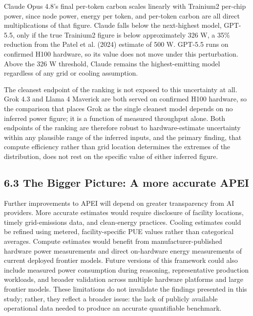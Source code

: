 \documentclass[11pt]{article}
\begin{document}
Claude Opus 4.8's final per-token carbon scales linearly with Trainium2 per-chip power, since node power, energy per token, and per-token carbon are all direct multiplications of that figure. Claude falls below the next-highest model, GPT-5.5, only if the true Trainium2 figure is below approximately 326 W, a 35\% reduction from the Patel et al. (2024) estimate of 500 W. GPT-5.5 runs on confirmed H100 hardware, so its value does not move under this perturbation. Above the 326 W threshold, Claude remains the highest-emitting model regardless of any grid or cooling assumption.

The cleanest endpoint of the ranking is not exposed to this uncertainty at all. Grok 4.3 and Llama 4 Maverick are both served on confirmed H100 hardware, so the comparison that places Grok as the single cleanest model depends on no inferred power figure; it is a function of measured throughput alone. Both endpoints of the ranking are therefore robust to hardware-estimate uncertainty within any plausible range of the inferred inputs, and the primary finding, that compute efficiency rather than grid location determines the extremes of the distribution, does not rest on the specific value of either inferred figure.

\subsection*{6.3 The Bigger Picture: A more accurate APEI}

Further improvements to APEI will depend on greater transparency from AI providers. More accurate estimates would require disclosure of facility locations, timely grid-emissions data, and clean-energy practices. Cooling estimates could be refined using metered, facility-specific PUE values rather than categorical averages. Compute estimates would benefit from manufacturer-published hardware power measurements and direct on-hardware energy measurements of current deployed frontier models. Future versions of this framework could also include measured power consumption during reasoning, representative production workloads, and broader validation across multiple hardware platforms and large frontier models. These limitations do not invalidate the findings presented in this study; rather, they reflect a broader issue: the lack of publicly available operational data needed to produce an accurate quantifiable benchmark.

\end{document}
